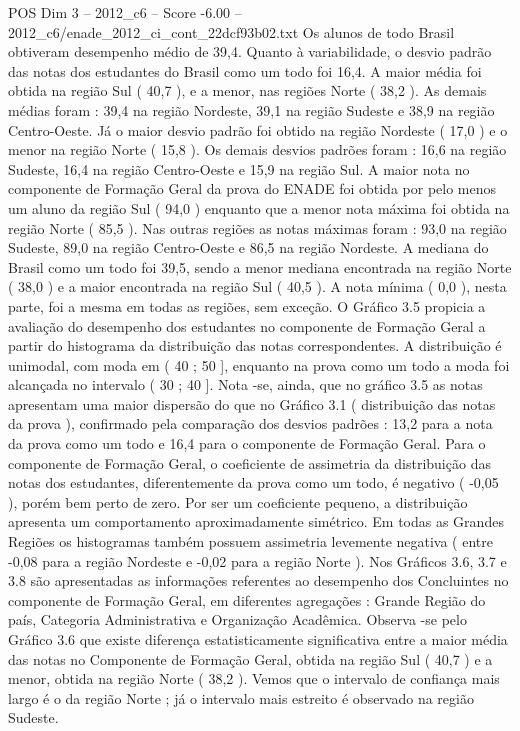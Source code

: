 \begin{textsample}{POS Dim 3 – 2012\_c6 – Score -6.00 – 2012\_c6/enade\_2012\_ci\_cont\_22dcf93b02.txt}
Os alunos de todo Brasil obtiveram desempenho médio de 39,4.
Quanto à variabilidade, o desvio padrão das notas dos estudantes do Brasil como um todo foi 16,4.
A maior média foi obtida na região Sul ( 40,7 ), e a menor, nas regiões Norte ( 38,2 ).
As demais médias foram : 39,4 na região Nordeste, 39,1 na região Sudeste e 38,9 na região Centro-Oeste.
Já o maior desvio padrão foi obtido na região Nordeste ( 17,0 ) e o menor na região Norte ( 15,8 ).
Os demais desvios padrões foram : 16,6 na região Sudeste, 16,4 na região Centro-Oeste e 15,9 na região Sul.
A maior nota no componente de Formação Geral da prova do ENADE foi obtida por pelo menos um aluno da região Sul ( 94,0 ) enquanto que a menor nota máxima foi obtida na região Norte ( 85,5 ).
Nas outras regiões as notas máximas foram : 93,0 na região Sudeste, 89,0 na região Centro-Oeste e 86,5 na região Nordeste.
A mediana do Brasil como um todo foi 39,5, sendo a menor mediana encontrada na região Norte ( 38,0 ) e a maior encontrada na região Sul ( 40,5 ).
A nota mínima ( 0,0 ), nesta parte, foi a mesma em todas as regiões, sem exceção.
O Gráfico 3.5 propicia a avaliação do desempenho dos estudantes no componente de Formação Geral a partir do histograma da distribuição das notas correspondentes.
A distribuição é unimodal, com moda em ( 40 ; 50 ], enquanto na prova como um todo a moda foi alcançada no intervalo ( 30 ; 40 ].
Nota -se, ainda, que no gráfico 3.5 as notas apresentam uma maior dispersão do que no Gráfico 3.1 ( distribuição das notas da prova ), confirmado pela comparação dos desvios padrões : 13,2 para a nota da prova como um todo e 16,4 para o componente de Formação Geral.
Para o componente de Formação Geral, o coeficiente de assimetria da distribuição das notas dos estudantes, diferentemente da prova como um todo, é negativo ( -0,05 ), porém bem perto de zero.
Por ser um coeficiente pequeno, a distribuição apresenta um comportamento aproximadamente simétrico.
Em todas as Grandes Regiões os histogramas também possuem assimetria levemente negativa ( entre -0,08 para a região Nordeste e -0,02 para a região Norte ).
Nos Gráficos 3.6, 3.7 e 3.8 são apresentadas as informações referentes ao desempenho dos Concluintes no componente de Formação Geral, em diferentes agregações : Grande Região do país, Categoria Administrativa e Organização Acadêmica.
Observa -se pelo Gráfico 3.6 que existe diferença estatisticamente significativa entre a maior média das notas no Componente de Formação Geral, obtida na região Sul ( 40,7 ) e a menor, obtida na região Norte ( 38,2 ).
Vemos que o intervalo de confiança mais largo é o da região Norte ; já o intervalo mais estreito é observado na região Sudeste.

\end{textsample}

